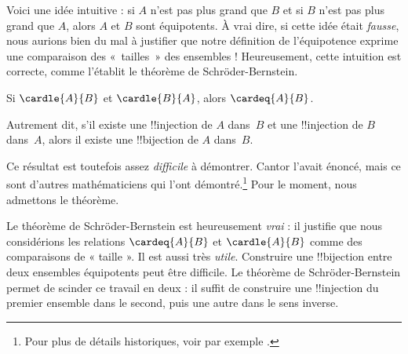 \documentclass[../../../include/open-logic-section]{subfiles}
\begin{document}


\begin{explain}
Voici une idée intuitive : si $A$ n'est pas plus grand que $B$ et
si $B$ n'est pas plus grand que $A$, alors $A$ et $B$ sont
équipotents. À vrai dire, si cette idée était \emph{fausse}, nous
aurions bien du mal à justifier que notre définition de l'équipotence
exprime une comparaison des «~tailles~» des ensembles !{} Heureusement,
cette intuition est correcte, comme l'établit le théorème de
Schr\"oder-Bernstein.
\end{explain}

\begin{thm}
  Si $\cardle{A}{B}$ et $\cardle{B}{A}$, alors $\cardeq{A}{B}$.
\end{thm}

\begin{explain}
Autrement dit, s'il existe une !!{injection} de $A$ dans~$B$ et
une !!{injection} de $B$ dans~$A$, alors il existe une
!!{bijection} de $A$ dans~$B$.

Ce résultat est toutefois assez \emph{difficile} à démontrer. Cantor
l'avait énoncé, mais ce sont d'autres mathématiciens qui l'ont
démontré.\footnote{Pour plus de détails historiques, voir par exemple
\citet[pp.~165--6]{Potter2004}.}
{Pour le moment, nous admettons le théorème.}%
%

Le théorème de Schr\"oder-Bernstein est heureusement \emph{vrai} :
il justifie que nous considérions les relations $\cardeq{A}{B}$
et $\cardle{A}{B}$ comme des comparaisons de « taille ». Il est
aussi très \emph{utile}. Construire une !!{bijection} entre deux
ensembles équipotents peut être difficile. Le théorème de
Schr\"oder-Bernstein permet de scinder ce travail en deux :
il suffit de construire une !!{injection} du premier ensemble
dans le second, puis une autre dans le sens inverse.
\end{explain}
\end{document}
